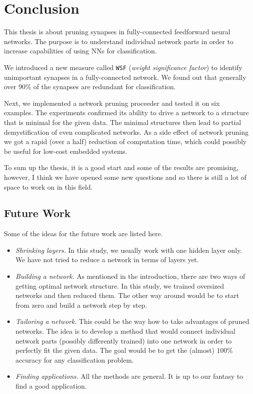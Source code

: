 \chapter{Conclusion} \label{chap:conclusion}
This thesis is about pruning synapses in fully-connected feedforward neural networks. The purpose is to understand individual network parts in order to increase capabilities of using NNs for classification.

We introduced a new measure called \texttt{WSF} (\textit{weight significance factor}) to identify unimportant synapses in a fully-connected network. We found out that generally over $ 90\% $ of the synapses are redundant for classification.

Next, we implemented a network pruning proceeder and tested it on six examples. The experiments confirmed its ability to drive a network to a structure that is minimal for the given data. The minimal structures then lead to partial demystification of even complicated networks. As a side effect of network pruning we got a rapid (over a half) reduction of computation time, which could possibly be useful for low-cost embedded systems.

To sum up the thesis, it is a good start and some of the results are promising, however, I think we have opened some new questions and so there is still a lot of space to work on in this field.

\section{Future Work} \label{sec:future_work}
Some of the ideas for the future work are listed here.

\begin{itemize}
\item \textit{Shrinking layers.} In this study, we usually work with one hidden layer only. We have not tried to reduce a network in terms of layers yet.
\item \textit{Building a network.} As mentioned in the introduction, there are two ways of getting optimal network structure. In this study, we trained oversized networks and then reduced them. The other way around would be to start from zero and build a network step by step.
\item \textit{Tailoring a network.} This could be the way how to take advantages of pruned networks. The idea is to develop a method that would connect individual network parts (possibly differently trained) into one network in order to perfectly fit the given data. The goal would be to get the (almost) $ 100\% $ accuracy for any classification problem.
\item \textit{Finding applications.} All the methods are general. It is up to our fantasy to find a good application.
\end{itemize}
